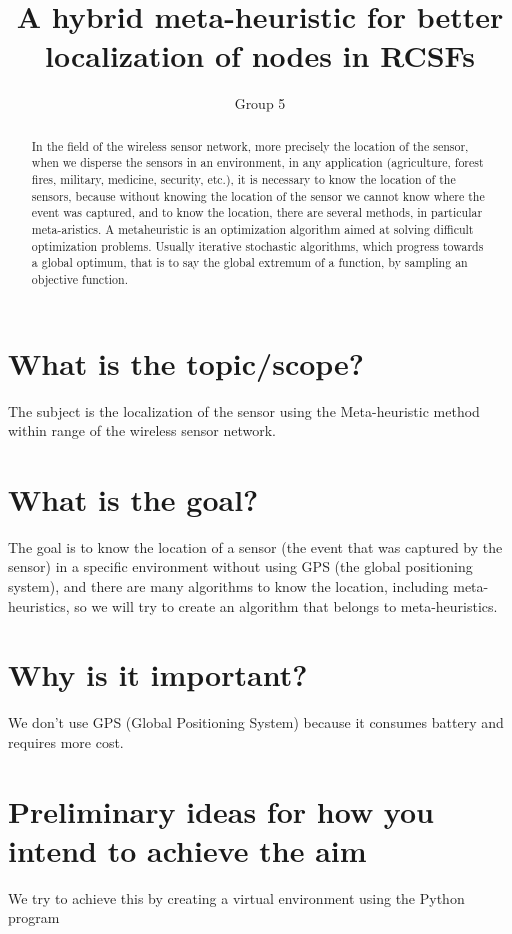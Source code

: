 \documentclass{article}
\title{A hybrid meta-heuristic for better localization of nodes in RCSFs}
\author{Group 5}
\begin{document}
\maketitle


\begin{abstract}
    In the field of the wireless sensor network, more precisely the location of the sensor, when we disperse the sensors in an environment, in any application (agriculture, forest fires, military, medicine, security, etc.), it is necessary to know the location of the sensors, because without knowing the location of the sensor we cannot know where the event was captured, and to know the location, there are several methods, in particular meta-aristics.
     A metaheuristic is an optimization algorithm aimed at solving difficult optimization problems. Usually iterative stochastic algorithms, which progress towards a global optimum, that is to say the global extremum of a function, by sampling an objective function.
\end{abstract}

\section{ What is the topic/scope?}
The subject is the localization of the sensor using the Meta-heuristic method within range of the wireless sensor network.



\section{ What is the goal?}
The goal is to know the location of a sensor (the event that was captured by the sensor) in a specific environment without using GPS (the global positioning system), and there are many algorithms to know the location, including meta-heuristics, so we will try to create an algorithm that belongs to meta-heuristics.
\section{ Why is it important?}
We don't use GPS (Global Positioning System) because it consumes battery and requires more cost.
\section{ Preliminary ideas for how you intend to achieve the aim}
We try to achieve this by creating a virtual environment using the Python program
\end{document}
